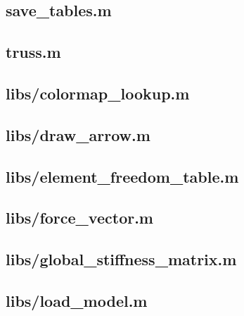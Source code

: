 \documentclass{article}
\begin{document}
\begin{appendices}
\subsection{save\_tables.m}\label{app:save_tables.m}


\subsection{truss.m}\label{app:truss.m}


\subsection{libs/colormap\_lookup.m}\label{app:libs/colormap_lookup.m}


\subsection{libs/draw\_arrow.m}\label{app:libs/draw_arrow.m}


\subsection{libs/element\_freedom\_table.m}\label{app:libs/element_freedom_table.m}


\subsection{libs/force\_vector.m}\label{app:libs/force_vector.m}


\subsection{libs/global\_stiffness\_matrix.m}\label{app:libs/global_stiffness_matrix.m}


\subsection{libs/load\_model.m}\label{app:libs/load_model.m}



\end{appendices}
\end{document}
